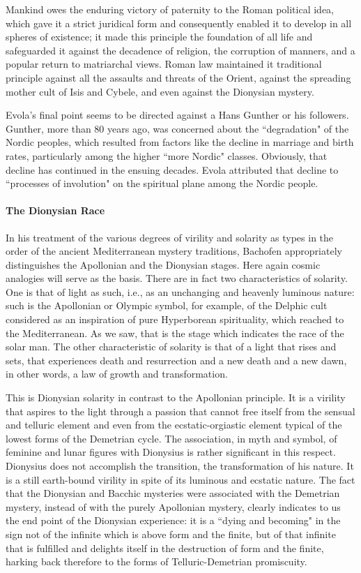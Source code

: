 \begin{quotex}
Mankind owes the enduring victory of paternity to the Roman political idea, which gave it a strict juridical form and consequently enabled it to develop in all spheres of existence; it made this principle the foundation of all life and safeguarded it against the decadence of religion, the corruption of manners, and a popular return to matriarchal views. Roman law maintained it traditional principle against all the assaults and threats of the Orient, against the spreading mother cult of Isis and Cybele, and even against the Dionysian mystery. 

\end{quotex}
Evola's final point seems to be directed against a Hans Gunther or his followers. Gunther, more than 80 years ago, was concerned about the ``degradation" of the Nordic peoples, which resulted from factors like the decline in marriage and birth rates, particularly among the higher ``more Nordic" classes. Obviously, that decline has continued in the ensuing decades. Evola attributed that decline to ``processes of involution" on the spiritual plane among the Nordic people.


\paragraph{The Dionysian Race}
In his treatment of the various degrees of virility and solarity as types in the order of the ancient Mediterranean mystery traditions, Bachofen appropriately distinguishes the Apollonian and the Dionysian stages. Here again cosmic analogies will serve as the basis. There are in fact two characteristics of solarity. One is that of light as such, i.e., as an unchanging and heavenly luminous nature: such is the Apollonian or Olympic symbol, for example, of the Delphic cult considered as an inspiration of pure Hyperborean spirituality, which reached to the Mediterranean. As we saw, that is the stage which indicates the race of the solar man. The other characteristic of solarity is that of a light that rises and sets, that experiences death and resurrection and a new death and a new dawn, in other words, a law of growth and transformation.

This is Dionysian solarity in contrast to the Apollonian principle. It is a virility that aspires to the light through a passion that cannot free itself from the sensual and telluric element and even from the ecstatic-orgiastic element typical of the lowest forms of the Demetrian cycle. The association, in myth and symbol, of feminine and lunar figures with Dionysius is rather significant in this respect. Dionysius does not accomplish the transition, the transformation of his nature. It is a still earth-bound virility in spite of its luminous and ecstatic nature. The fact that the Dionysian and Bacchic mysteries were associated with the Demetrian mystery, instead of with the purely Apollonian mystery, clearly indicates to us the end point of the Dionysian experience: it is a ``dying and becoming" in the sign not of the infinite which is above form and the finite, but of that infinite that is fulfilled and delights itself in the destruction of form and the finite, harking back therefore to the forms of Telluric-Demetrian promiscuity.

